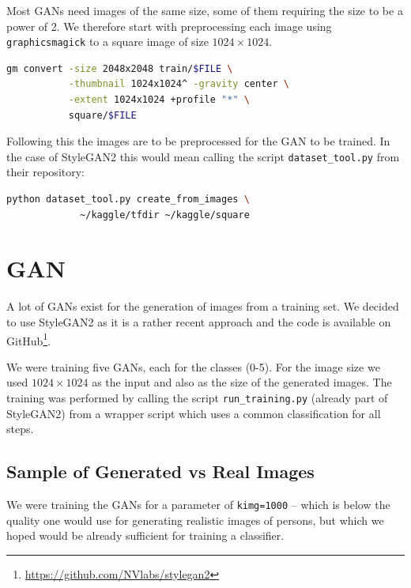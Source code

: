 \documentclass[sigconf,nonacm]{acmart}
\begin{document}
Most GANs need images of the same size, some of them requiring
the size to be a power of 2.
We therefore start with preprocessing each image
using \texttt{graphicsmagick}
to a square image of size $1024\times1024$.
\begin{lstlisting}[language=bash,basicstyle=\ttfamily\small]
gm convert -size 2048x2048 train/$FILE \
           -thumbnail 1024x1024^ -gravity center \
           -extent 1024x1024 +profile "*" \
           square/$FILE
\end{lstlisting}

Following this the images are to be preprocessed for the GAN
to be trained.
In the case of StyleGAN2 this would mean calling the
script \texttt{dataset\_tool.py} from their repository:
\begin{lstlisting}[language=bash,basicstyle=\ttfamily\small]
python dataset_tool.py create_from_images \
             ~/kaggle/tfdir ~/kaggle/square
\end{lstlisting}
\section{GAN}

A lot of GANs exist for the generation of images from a training set.
We decided to use
StyleGAN2\cite{stylegan2}
as it is a rather recent approach and the code is available on
GitHub\footnote{\url{https://github.com/NVlabs/stylegan2}}.

We were training five GANs, each for the classes (0-5).
For the image size we used $1024\times1024$ as the input and
also as the size of the generated images.
The training was performed by calling the script \texttt{run\_training.py}
(already part of StyleGAN2) from a wrapper script which uses a common
classification for all steps.

\subsection{Sample of Generated vs Real Images}

We were training the GANs for a parameter of \texttt{kimg=1000} -- which
is below the quality one would use for generating realistic images of persons,
but which we hoped would be already sufficient for training a classifier.
\end{document}
